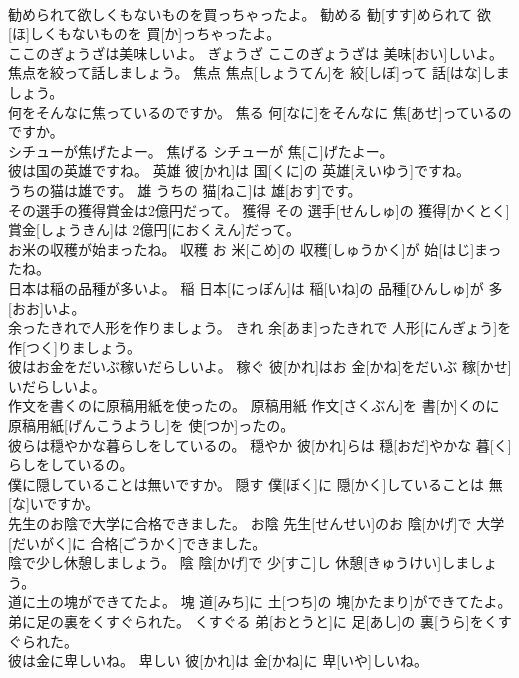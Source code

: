 \documentclass[8pt]{extreport}
\begin{document}
\begin{CJK}{UTF8}{min}
\\	勧められて欲しくもないものを買っちゃったよ。	勧める	勧[すす]められて 欲[ほ]しくもないものを 買[か]っちゃったよ。	
\\	ここのぎょうざは美味しいよ。	ぎょうざ	ここのぎょうざは 美味[おい]しいよ。	
\\	焦点を絞って話しましょう。	焦点	焦点[しょうてん]を 絞[しぼ]って 話[はな]しましょう。	
\\	何をそんなに焦っているのですか。	焦る	何[なに]をそんなに 焦[あせ]っているのですか。	
\\	シチューが焦げたよー。	焦げる	シチューが 焦[こ]げたよー。	
\\	彼は国の英雄ですね。	英雄	彼[かれ]は 国[くに]の 英雄[えいゆう]ですね。	
\\	うちの猫は雄です。	雄	うちの 猫[ねこ]は 雄[おす]です。	
\\	その選手の獲得賞金は2億円だって。	獲得	その 選手[せんしゅ]の 獲得[かくとく] 賞金[しょうきん]は 2億円[におくえん]だって。	
\\	お米の収穫が始まったね。	収穫	お 米[こめ]の 収穫[しゅうかく]が 始[はじ]まったね。	
\\	日本は稲の品種が多いよ。	稲	日本[にっぽん]は 稲[いね]の 品種[ひんしゅ]が 多[おお]いよ。	
\\	余ったきれで人形を作りましょう。	きれ	余[あま]ったきれで 人形[にんぎょう]を 作[つく]りましょう。	
\\	彼はお金をだいぶ稼いだらしいよ。	稼ぐ	彼[かれ]はお 金[かね]をだいぶ 稼[かせ]いだらしいよ。	
\\	作文を書くのに原稿用紙を使ったの。	原稿用紙	作文[さくぶん]を 書[か]くのに 原稿用紙[げんこうようし]を 使[つか]ったの。	
\\	彼らは穏やかな暮らしをしているの。	穏やか	彼[かれ]らは 穏[おだ]やかな 暮[く]らしをしているの。	
\\	僕に隠していることは無いですか。	隠す	僕[ぼく]に 隠[かく]していることは 無[な]いですか。	
\\	先生のお陰で大学に合格できました。	お陰	先生[せんせい]のお 陰[かげ]で 大学[だいがく]に 合格[ごうかく]できました。	
\\	陰で少し休憩しましょう。	陰	陰[かげ]で 少[すこ]し 休憩[きゅうけい]しましょう。	
\\	道に土の塊ができてたよ。	塊	道[みち]に 土[つち]の 塊[かたまり]ができてたよ。	
\\	弟に足の裏をくすぐられた。	くすぐる	弟[おとうと]に 足[あし]の 裏[うら]をくすぐられた。	
\\	彼は金に卑しいね。	卑しい	彼[かれ]は 金[かね]に 卑[いや]しいね。	

\end{CJK}
\end{document}
